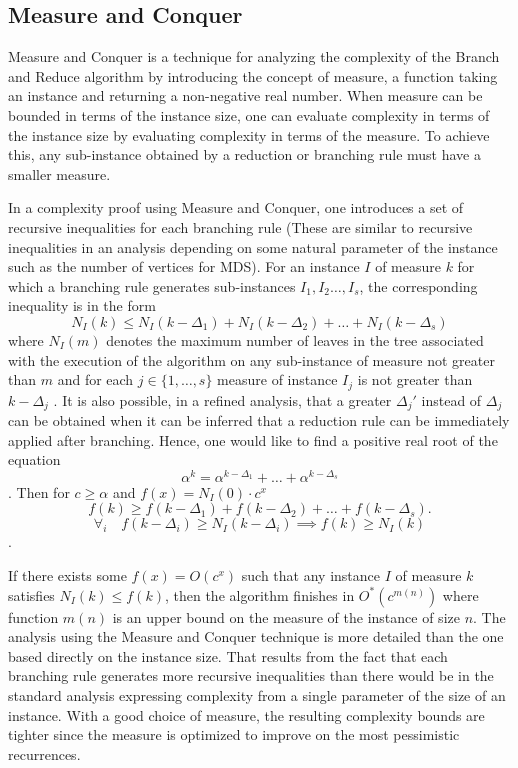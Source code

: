 \subsection{Measure and Conquer} \label{family_of_recurrences}
Measure and Conquer is a technique for analyzing the complexity of the Branch and Reduce algorithm by introducing the concept of measure, a function taking an instance and returning a non-negative real number. When measure can be bounded in terms of the instance size, one can evaluate complexity in terms of the instance size by evaluating complexity in terms of the measure. To achieve this, any sub-instance obtained by a reduction or branching rule must have a smaller measure.
\par In a complexity proof using Measure and Conquer, one introduces a set of recursive inequalities for each branching rule (These are similar to recursive inequalities in an analysis depending on some natural parameter of the instance such as the number of vertices for MDS). For an instance $I$ of measure $k$ for which a branching rule generates sub-instances $I_1, I_2 \dots, I_s$, the corresponding inequality is in the form
\begin{equation} \label{reccursive_inequality}
    N_I(k) \leq N_I(k - \Delta_1) + N_I(k - \Delta_2) + \dots + N_I(k - \Delta_s)
\end{equation}
where $N_I(m)$ denotes the maximum number of leaves in the tree associated with the execution of the algorithm on any sub-instance of measure not greater than $m$ and for each $j \in \{1, \dots, s\}$ measure of instance $I_j$ is not greater than $k - \Delta_j$ \cite{DBLP:journals/eatcs/FominGK05} \cite{VANROOIJ20112147}. It is also possible, in a refined analysis, that a greater $\Delta_j'$ instead of $\Delta_j$ can be obtained when it can be inferred that a reduction rule can be immediately applied after branching. Hence, one would like to find a positive real root of the equation
\begin{equation} \label{alpha_inequality}
    \alpha^k = \alpha^{k-\Delta_1} + \dots + \alpha^{k-\Delta_s}
\end{equation}
\cite{DBLP:journals/eatcs/FominGK05}. Then for $c\geq\alpha$ and $f(x) = N_I(0)\cdot c^x$
$$
f(k) \geq f(k - \Delta_1) + f(k - \Delta_2) + \dots + f(k - \Delta_s).
$$
$$\forall_i\quad f(k - \Delta_i) \geq N_I(k -\Delta_i) \implies f(k)\geq N_I(k)$$.

If there exists some $f(x) = O(c^x)$ such that any instance $I$ of measure $k$ satisfies $N_I(k) \leq f(k)$, then the algorithm finishes in $O^*(c^{m(n)})$ where function $m(n)$ is an upper bound on the measure of the instance of size $n$. The analysis using the Measure and Conquer technique is more detailed than the one based directly on the instance size. That results from the fact that each branching rule generates more recursive inequalities than there would be in the standard analysis expressing complexity from a single parameter of the size of an instance. With a good choice of measure, the resulting complexity bounds are tighter since the measure is optimized to improve on the most pessimistic recurrences.

